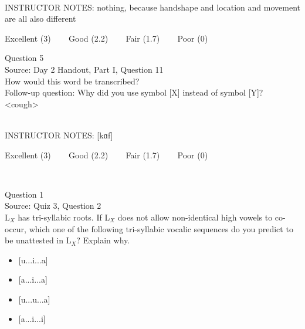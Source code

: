 \documentclass[12pt]{article}
\begin{document}
~\\
INSTRUCTOR NOTES: nothing, because handshape and location and movement are all also different


\vfill
Excellent (3) ~~~ Good (2.2) ~~~ Fair (1.7) ~~~ Poor (0)
\newpage

{\large Question 5}\\

Source: Day 2 Handout, Part I, Question 11\\

How would this word be transcribed?\\ Follow-up question: Why did you use symbol [X] instead of symbol [Y]?\\

<cough>


~\\
INSTRUCTOR NOTES: [kɑf]


\vfill
Excellent (3) ~~~ Good (2.2) ~~~ Fair (1.7) ~~~ Poor (0)
\newpage

\begin{center}
\textbf{{\color{red}{\HUGE END OF EXAM}}}\\

\end{center}
\newpage

\begin{center}
\textbf{{\color{blue}{\HUGE START OF EXAM\\}}}

\textbf{{\color{blue}{\HUGE Student ID: 3288\\}}}

\textbf{{\color{blue}{\HUGE 1:45 - 2:00 PM\\}}}

\end{center}
\newpage

{\large Question 1}\\

Source: Quiz 3, Question 2\\

L$_X$ has tri-syllabic roots. If L$_X$ does not allow non-identical high vowels to co-occur, which one of the following tri-syllabic vocalic sequences do you predict to be unattested in L$_X$? Explain why.\\

\begin{itemize} \item {[u...i...a]} \item {[a...i...a]} \item {[u...u...a]} \item {[a...i...i]} \end{itemize}
\end{document}
